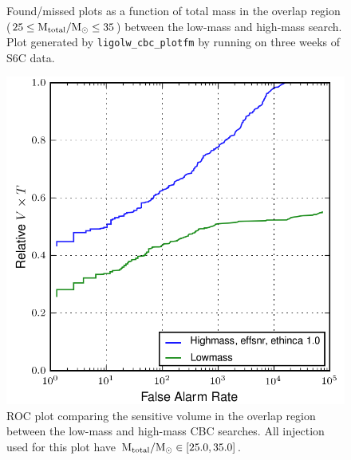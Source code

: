 \begin{figure}[p]
\label{fig:mass_investigation-plotfm}
\caption{Found/missed plots as a function of total mass in the overlap region ($25 \leq \mathrm{M_{total}}/\mathrm{M_\odot} \leq 35$) between the low-mass and high-mass search. Plot generated by \texttt{ligolw\_cbc\_plotfm} by running on three weeks of S6C data.}
\end{figure}

\begin{figure}[p]
\center
\label{fig:mass_investigation-plotroc}
\includegraphics[width=5in]{figures/lower_tmpltbank_investigation/overlap_allinj_ROC.png}
\caption{ROC plot comparing the sensitive volume in the overlap region between the low-mass and high-mass \ac{CBC} searches. All injection used for this plot have $\mathrm{M_{total}}/\mathrm{M_\odot} \in [25.0, 35.0]$.}
\end{figure}


